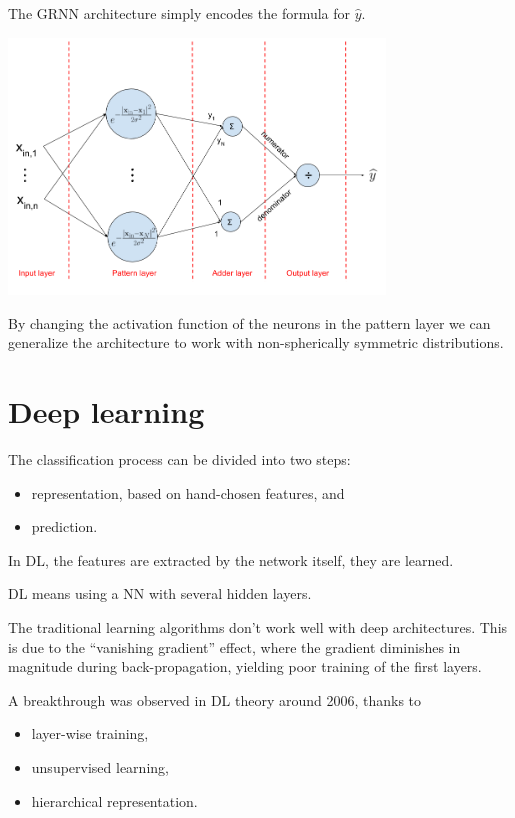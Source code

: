 \documentclass[oneside,onecolumn]{report}
\begin{document}
The GRNN architecture simply encodes the formula for $\widehat y$.

\begin{center}
    \includegraphics[width=10cm]{general_regression_neural_network.png}
\end{center}

By changing the activation function of the neurons in the pattern layer we can generalize the architecture to work with non-spherically symmetric distributions.

\clearpage
\section{Deep learning}
The classification process can be divided into two steps:
\begin{itemize}
    \item representation, based on hand-chosen features, and
    \item prediction.
\end{itemize}
In DL, the features are extracted by the network itself, they are learned.

DL means using a NN with several hidden layers.

The traditional learning algorithms don't work well with deep architectures.
This is due to the ``vanishing gradient'' effect, where the gradient diminishes in magnitude during back-propagation, yielding poor training of the first layers.

A breakthrough was observed in DL theory around 2006, thanks to
\begin{itemize}
    \item layer-wise training,
    \item unsupervised learning,
    \item hierarchical representation.
\end{itemize}
\end{document}
